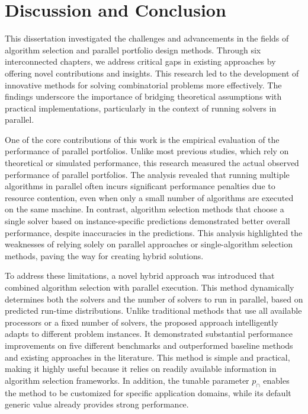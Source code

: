 
\chapter{Discussion and Conclusion}

This dissertation investigated the challenges and advancements in the fields of algorithm selection and parallel portfolio design methods. Through six interconnected chapters, we address critical gaps in existing approaches by offering novel contributions and insights. This research led to the development of innovative methods for solving combinatorial problems more effectively. The findings underscore the importance of bridging theoretical assumptions with practical implementations, particularly in the context of running solvers in parallel.

One of the core contributions of this work is the empirical evaluation of the performance of parallel portfolios. Unlike most previous studies, which rely on theoretical or simulated performance, this research measured the actual observed performance of parallel portfolios. The analysis revealed that running multiple algorithms in parallel often incurs significant performance penalties due to resource contention, even when only a small number of algorithms are executed on the same machine. In contrast, algorithm selection methods that choose a single solver based on instance-specific predictions demonstrated better overall performance, despite inaccuracies in the predictions. This analysis highlighted the weaknesses of relying solely on parallel approaches or single-algorithm selection methods, paving the way for creating hybrid solutions.

To address these limitations, a novel hybrid approach was introduced that combined algorithm selection with parallel execution. This method dynamically determines both the solvers and the number of solvers to run in parallel, based on predicted run-time distributions. Unlike traditional methods that use all available processors or a fixed number of solvers, the proposed approach intelligently adapts to different problem instances. It demonstrated substantial performance improvements on five different benchmarks and outperformed baseline methods and existing approaches in the literature. This method is simple and practical, making it highly useful because it relies on readily available information in algorithm selection frameworks. In addition, the tunable parameter $p_{\cap}$ enables the method to be customized for specific application domains, while its default generic value already provides strong performance.

